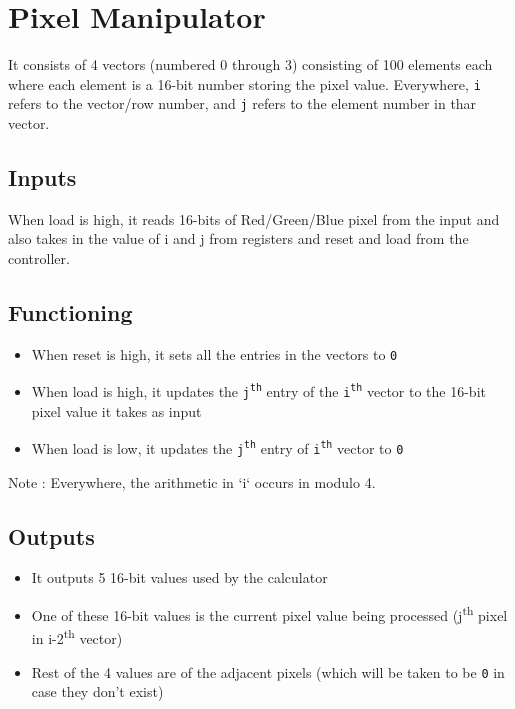 \documentclass[a4paper,12pt]{article}
\begin{document}
\clearpage

\vspace*{-3.5cm}
\section{Pixel Manipulator}
It consists of 4 vectors (numbered 0 through 3) consisting of 100 elements each where each element is a 16-bit number storing the pixel value. Everywhere, \texttt{i} refers to the vector/row number, and \texttt{j} refers to the element number in thar vector.
	
\vspace*{-0.1cm}
\subsection{Inputs}
\vspace*{-0.2cm}
When load is high, it reads 16-bits of Red/Green/Blue pixel from the input and also takes in the value of i and j from registers and reset and load from the controller.
\vspace*{-0.1cm}
\subsection{Functioning}
\vspace*{-0.2cm}
\begin{itemize}
  	\setlength{\itemsep}{-0.1cm}
	\item When reset is high, it sets all the entries in the vectors to \texttt{0}
	\item When load is high, it updates the \texttt{j\textsuperscript{th}} entry of the \texttt{i\textsuperscript{th}} vector to the 16-bit pixel value it takes as input
	\item When load is low, it updates the \texttt{j\textsuperscript{th}} entry of \texttt{i\textsuperscript{th}} vector to \texttt{0}
\end{itemize}
\vspace*{-0.2cm}
Note : Everywhere, the arithmetic in `i` occurs in modulo 4.
\vspace*{-0.1cm}
\subsection{Outputs} 
\vspace*{-0.2cm}
\begin{itemize}
  	\setlength{\itemsep}{-0.1cm}
	\item It outputs 5 16-bit values used by the calculator
	\item One of these 16-bit values is the current pixel value being processed (j\textsuperscript{th} pixel in {i-2}\textsuperscript{th} vector)
	\item Rest of the 4 values are of the adjacent pixels (which will be taken to be \texttt{0} in case they don't exist)
\end{itemize}
\end{document}
